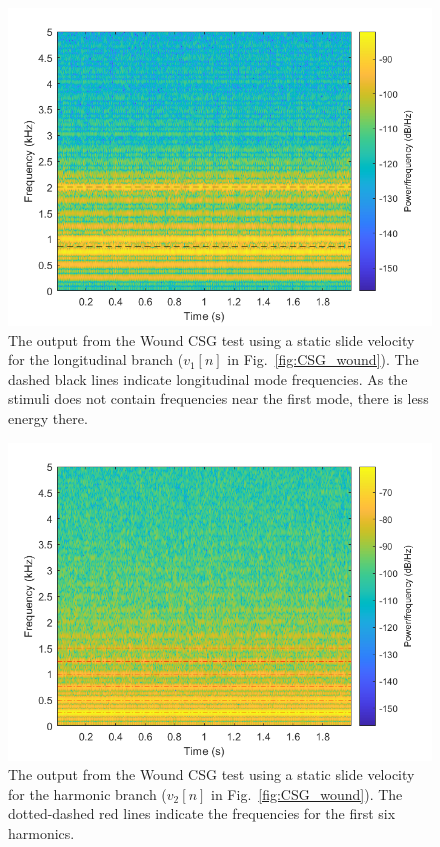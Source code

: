 \documentclass[../main.tex]{subfiles}
\begin{document}
\begin{figure}[h!]
    \centering
    \includegraphics[scale=.57]{./images/plots/CSG_Wound_Static_Long.png}
    \caption{The output from the Wound CSG test using a static slide velocity for the longitudinal branch ($v_1[n]$ in Fig.~\ref{fig:CSG_wound}). The dashed black lines indicate longitudinal mode frequencies. As the stimuli does not contain frequencies near the first mode, there is less energy there.}
    \label{fig:CSGWoundStaticLong}
\end{figure}

\begin{figure}[h!]
    \centering
    \includegraphics[scale=.60]{./images/plots/CSG_Wound_Static_Harm.png}
    \caption{The output from the Wound CSG test using a static slide velocity for the harmonic branch ($v_2[n]$ in Fig.~\ref{fig:CSG_wound}). The dotted-dashed red lines indicate the frequencies for the first six harmonics.}
    \label{fig:CSGWoundStaticHarm}
\end{figure}
\end{document}
